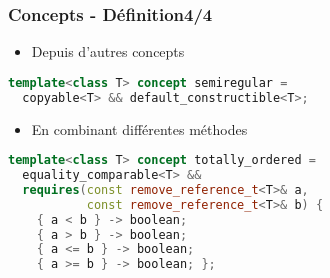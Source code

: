 \documentclass[C++.tex]{subfiles}
\begin{document}
\begin{frame}[fragile]
	\frametitle{Concepts - Définition\titlehfill{}4/4}
	\begin{itemize}
		\item Depuis d'autres concepts
	\end{itemize}

	\begin{lstlisting}[language=C++]
template<class T> concept semiregular = 
  copyable<T> && default_constructible<T>;\end{lstlisting}

	\begin{itemize}
		\item En combinant différentes méthodes
	\end{itemize}

	\begin{lstlisting}[language=C++]
template<class T> concept totally_ordered =
  equality_comparable<T> &&
  requires(const remove_reference_t<T>& a,
           const remove_reference_t<T>& b) {
    { a < b } -> boolean;
    { a > b } -> boolean;
    { a <= b } -> boolean;
    { a >= b } -> boolean; };\end{lstlisting}
\end{frame}
\end{document}
